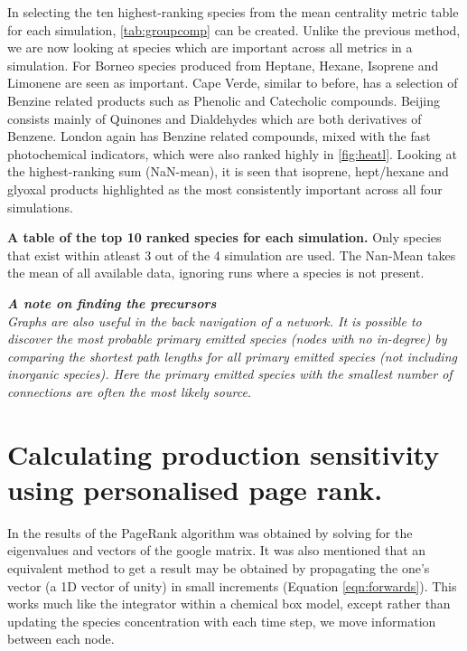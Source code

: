In selecting the ten highest-ranking species from the mean centrality metric table for each simulation, \autoref{tab:groupcomp} can be created. Unlike the previous method, we are now looking at species which are important across all metrics in a simulation. For Borneo species produced from Heptane, Hexane, Isoprene and Limonene are seen as important. Cape Verde, similar to before, has a selection of Benzine related products such as Phenolic and Catecholic compounds. Beijing consists mainly of Quinones and Dialdehydes which are both derivatives of Benzene. London again has Benzine related compounds, mixed with the fast photochemical indicators, which were also ranked highly in \autoref{fig:heatl}. Looking at the highest-ranking sum (NaN-mean), it is seen that isoprene, hept/hexane and glyoxal products highlighted as the most consistently important across all four simulations. 

\begin{table}[H]
\centering
\small

\caption{\textbf{A table of the top 10 ranked species for each simulation.} Only species that exist within atleast 3 out of the 4 simulation are used. The Nan-Mean takes the mean of all available data, ignoring runs where a species is not present.}
\label{tab:groupcomp}
\end{table} 



\textit{\textbf{A note on finding the precursors}\\ Graphs are also useful in the back navigation of a network. It is possible to discover the most probable primary emitted species (nodes with no in-degree) by comparing the shortest path lengths for all primary emitted species (not including inorganic species). Here the primary emitted species with the smallest number of connections are often the most likely source.}




\section{Calculating production sensitivity using personalised page rank.}

In \label{sec:pagerank} the results of the PageRank algorithm was obtained by solving for the eigenvalues and vectors of the google matrix. It was also mentioned that an equivalent method to get a result may be obtained by propagating the one's vector (a 1D vector of unity) in small increments (Equation \autoref{eqn:forwards}). This works much like the integrator within a chemical box model, except rather than updating the species concentration with each time step, we move information between each node. 

